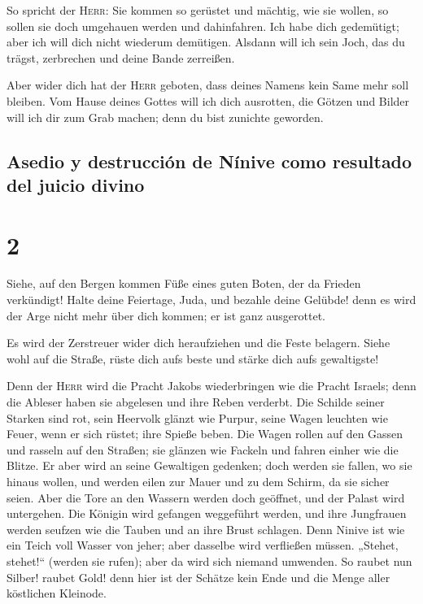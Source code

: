  So spricht der \textsc{Herr}: Sie kommen so gerüstet und
mächtig, wie sie wollen, so sollen sie doch umgehauen werden und
dahinfahren. Ich habe dich gedemütigt; aber ich will dich nicht wiederum
demütigen.  Alsdann will ich sein Joch, das du trägst,
zerbrechen und deine Bande zerreißen.

 Aber wider dich hat der \textsc{Herr} geboten, dass
deines Namens kein Same mehr soll bleiben. Vom Hause deines Gottes will
ich dich ausrotten, die Götzen und Bilder will ich dir zum Grab machen;
denn du bist zunichte geworden.

\hypertarget{asedio-y-destrucciuxf3n-de-nuxednive-como-resultado-del-juicio-divino}{%
\subsection{Asedio y destrucción de Nínive como resultado del juicio
divino}\label{asedio-y-destrucciuxf3n-de-nuxednive-como-resultado-del-juicio-divino}}

\hypertarget{section-1}{%
\section{2}\label{section-1}}

 Siehe, auf den Bergen kommen Füße eines guten Boten, der
da Frieden verkündigt! Halte deine Feiertage, Juda, und bezahle deine
Gelübde! denn es wird der Arge nicht mehr über dich kommen; er ist ganz
ausgerottet.

 Es wird der Zerstreuer wider dich heraufziehen und die
Feste belagern. Siehe wohl auf die Straße, rüste dich aufs beste und
stärke dich aufs gewaltigste!

 Denn der \textsc{Herr} wird die Pracht Jakobs
wiederbringen wie die Pracht Israels; denn die Ableser haben sie
abgelesen und ihre Reben verderbt.  Die Schilde seiner
Starken sind rot, sein Heervolk glänzt wie Purpur, seine Wagen leuchten
wie Feuer, wenn er sich rüstet; ihre Spieße beben.  Die
Wagen rollen auf den Gassen und rasseln auf den Straßen; sie glänzen wie
Fackeln und fahren einher wie die Blitze.  Er aber wird an
seine Gewaltigen gedenken; doch werden sie fallen, wo sie hinaus wollen,
und werden eilen zur Mauer und zu dem Schirm, da sie sicher seien.
 Aber die Tore an den Wassern werden doch geöffnet, und
der Palast wird untergehen.  Die Königin wird gefangen
weggeführt werden, und ihre Jungfrauen werden seufzen wie die Tauben und
an ihre Brust schlagen.  Denn Ninive ist wie ein Teich
voll Wasser von jeher; aber dasselbe wird verfließen müssen. „Stehet,
stehet!{}`` (werden sie rufen); aber da wird sich niemand umwenden.
 So raubet nun Silber! raubet Gold! denn hier ist der
Schätze kein Ende und die Menge aller köstlichen Kleinode.

